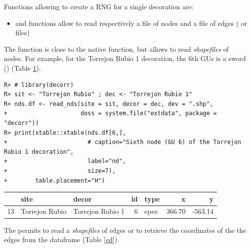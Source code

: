 \documentclass[article]{jss}\usepackage{knitr}
\begin{document}
Functions allowing to create a RNG for a single decoration are:

\begin{itemize}
\setlength\itemsep{.1em}
  \item {} and  functions allow to read respectively a file of nodes and a file of edges ( or  files)
\end{itemize}

The  function is close to the  native  function, but allows to read \emph{shapefiles} of nodes. For example, for the Torrejon Rubio 1 decoration, the 6th GUs is a sword () (Table \ref{nd}).

\begin{kframe}
\begin{verbatim}
R> # library(decorr)
R> sit <- "Torrejon Rubio" ; dec <- "Torrejon Rubio 1"
R> nds.df <- read_nds(site = sit, decor = dec, dev = ".shp",
+                     doss = system.file("extdata", package = "decorr"))
R> print(xtable::xtable(nds.df[6,],
+                       # caption="Sixth node (GU 6) of the Torrejon Rubio 1 decoration",
+                       label="nd",
+                       size=7),
+        table.placement="H")
\end{verbatim}
\end{kframe}%
\begin{table}[H]
\centering
\begin{tabular}{rllrlrr}
  \hline
 & site & decor & id & type & x & y \\ 
  \hline
13 & Torrejon Rubio & Torrejon Rubio 1 &   6 & epee & 366.70 & -563.14 \\ 
   \hline
\end{tabular}
\label{nd}
\end{table}


The  permits to read a \emph{shapefiles} of edges or to retrieve the coordinates of the the edges from the  dataframe (Table \ref{ed}).
\end{document}
